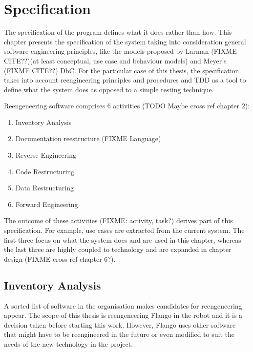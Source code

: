 \chapter{Specification}
The specification of the program defines what it does rather than how.
This chapter presents the specification of the system taking into consideration general software engineering principles, like the models proposed by Larman (FIXME CITE??)(at least conceptual, use case and behaviour models) and Meyer's (FIXME CITE??) \ac{DbC}.
For the particular case of this thesis, the specification takes into account reengineering principles and procedures and \ac{TDD} as a tool to define what the system does as opposed to a simple testing technique.

Reengeneering software comprises 6 activities (TODO Maybe cross ref chapter 2): 
\begin{enumerate}
    \item Inventory Analysis
    \item Documentation reestructure (FIXME Language)
    \item Reverse Engineering
    \item Code Restructuring
    \item Data Restructuring
    \item Forward Engineering
\end{enumerate}   
   
The outcome of these activities (FIXME: activity, task?) derives part of this specification.
For example, use cases are extracted from the current system.
The first three focus on what the system does and are used in this chapter, whereas the last three are highly coupled to technology and are expanded in chapter design (FIXME cross ref chapter 6?).

\section{Inventory Analysis}
A sorted list of software in the organisation makes candidates for reengeneering appear.
The scope of this thesis is reengeneering Flango in the robot and it is a decision taken before starting this work.
However, Flango uses other software that might have to be reengineered in the future or even modified to suit the needs of the new technology in the project.

